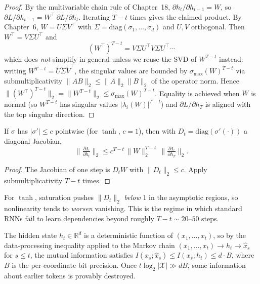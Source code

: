 \begin{proof}
By the multivariable chain rule of Chapter~18,
$\partial h_t / \partial h_{t-1} = W$, so
$\partial L / \partial h_{t-1} = W^\top\,\partial L/\partial h_t$.
Iterating $T-t$ times gives the claimed product. By Chapter~6,
$W = U\Sigma V^\top$ with $\Sigma = \mathrm{diag}(\sigma_1, \dots,
\sigma_d)$ and $U, V$ orthogonal. Then $W^\top = V\Sigma U^\top$ and
\[
  (W^\top)^{T-t}
  = V \Sigma U^\top V \Sigma U^\top \cdots
\]
which does \emph{not} simplify in general unless we reuse the SVD of
$W^{T-t}$ instead: writing $W^{T-t} = \tilde U \tilde \Sigma \tilde V^\top$,
the singular values are bounded by $\sigma_{\max}(W)^{T-t}$ via
submultiplicativity $\|AB\|_2 \leq \|A\|_2\|B\|_2$ of the operator norm.
Hence
$\|(W^\top)^{T-t}\|_2 = \|W^{T-t}\|_2 \leq \sigma_{\max}(W)^{T-t}$.
Equality is achieved when $W$ is normal (so $W^{T-t}$ has singular
values $|\lambda_i(W)|^{T-t}$) and $\partial L/\partial h_T$ is aligned
with the top singular direction.
\end{proof}

\begin{corollary}
\label{cor:nonlin}
If $\sigma$ has $|\sigma'| \leq c$ pointwise (for $\tanh$, $c = 1$),
then with $D_t = \mathrm{diag}(\sigma'(\cdot))$ a diagonal Jacobian,
\[
  \Big\|\tfrac{\partial L}{\partial h_t}\Big\|_2
  \leq c^{T-t}\,\|W\|_2^{T-t}\,
       \Big\|\tfrac{\partial L}{\partial h_T}\Big\|_2.
\]
\end{corollary}

\begin{proof}
The Jacobian of one step is $D_t W$ with $\|D_t\|_2 \leq c$. Apply
submultiplicativity $T-t$ times.
\end{proof}

\begin{remark}
For $\tanh$, saturation pushes $\|D_t\|_2$ \emph{below} $1$ in the
asymptotic regions, so nonlinearity tends to \emph{worsen} vanishing.
This is the regime in which standard RNNs fail to learn dependencies
beyond roughly $T - t \sim 20$--$50$ steps.
\end{remark}

\begin{theorem}
\label{thm:bottleneck}
The hidden state $h_t \in \mathbb{R}^d$ is a deterministic function of
$(x_1, \dots, x_t)$, so by the data-processing inequality applied to
the Markov chain $(x_1, \dots, x_t) \to h_t \to \hat x_s$ for $s \leq t$,
the mutual information satisfies
$I(x_s ; \hat x_s) \leq I(x_s ; h_t) \leq d \cdot B$, where $B$ is the
per-coordinate bit precision. Once $t \log_2 |\mathcal{X}| \gg d B$,
some information about earlier tokens is provably destroyed.
\end{theorem}

